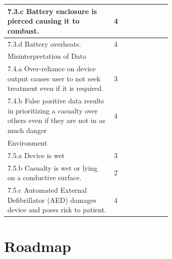 \documentclass{article}
\begin{document}
\begin{longtable}{|p{0.65\linewidth}|l|}
\hline
7.3.c Battery enclosure is pierced causing it to combust.                                                                                                          & 4                   \\
\hline
7.3.d Battery overheats.                                         & 4                   \\
\hline
\rowcolor{Gray}
Misinterpretation of Data                                          &                     \\
\hline
7.4.a Over-reliance on device output causes user to not seek treatment even if it is required.                                                                     & 3                   \\
\hline
7.4.b False positive data results in prioritizing a casualty over others even if they are not in as much danger                                                   & 4                   \\
\hline
\rowcolor{Gray}
Environment                                                        &                     \\
\hline
7.5.a Device is wet                                              & 3                   \\
\hline
7.5.b Casualty is wet or lying on a conductive surface.                                                                                                            & 2                   \\
\hline
7.5.c Automated External Defibrillator (AED) damages device and poses risk to patient.                                                                             & 4                  \\
\hline
\end{longtable}
\newpage
\section{Roadmap}
\end{document}
